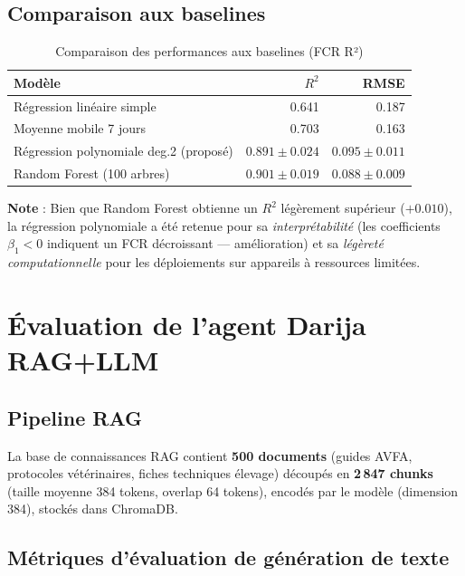 \subsection{Comparaison aux baselines}

\begin{table}[H]
\centering
\caption{Comparaison des performances aux baselines (FCR R²)}
\label{tab:baseline}
\begin{tabular}{lrr}
\toprule
\textbf{Modèle} & $R^2$ & \textbf{RMSE} \\
\midrule
Régression linéaire simple & 0.641 & 0.187 \\
Moyenne mobile 7 jours     & 0.703 & 0.163 \\
Régression polynomiale deg.2 (proposé) & $\mathbf{0.891 \pm 0.024}$ & $\mathbf{0.095 \pm 0.011}$ \\
Random Forest (100 arbres) & $0.901 \pm 0.019$ & $0.088 \pm 0.009$ \\
\bottomrule
\end{tabular}
\end{table}

\textbf{Note} : Bien que Random Forest obtienne un $R^2$ légèrement supérieur
($+0.010$), la régression polynomiale a été retenue pour sa \textit{interprétabilité}
(les coefficients $\beta_1 < 0$ indiquent un FCR décroissant — amélioration) et
sa \textit{légèreté computationnelle} pour les déploiements sur appareils à
ressources limitées.

\section{Évaluation de l'agent Darija RAG+LLM}
\label{sec:eval_darija}

\subsection{Pipeline RAG}

La base de connaissances RAG contient \textbf{500 documents} (guides AVFA,
protocoles vétérinaires, fiches techniques élevage) découpés en
\textbf{2\,847 chunks} (taille moyenne 384 tokens, overlap 64 tokens),
encodés par le modèle 
(dimension 384), stockés dans ChromaDB.

\subsection{Métriques d'évaluation de génération de texte}

